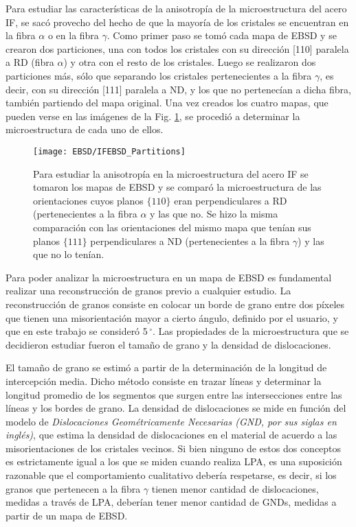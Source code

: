 Para estudiar las características de la anisotropía de la microestructura del acero IF, se sacó provecho del hecho de que la mayoría de los cristales se encuentran en la fibra $\alpha$ o en la fibra $\gamma$.
Como primer paso se tomó cada mapa de EBSD y se crearon dos particiones, una con todos los cristales con su dirección [110] paralela a RD (fibra $\alpha$) y otra con el resto de los cristales.
Luego se realizaron dos particiones más, sólo que separando los cristales pertenecientes a la fibra $\gamma$, es decir, con su dirección [111] paralela a ND, y los que no pertenecían a dicha fibra, también partiendo del mapa original.
Una vez creados los cuatro mapas, que pueden verse en las imágenes de la Fig. \ref{fig:IFEBSDPar}, se procedió a determinar la microestructura de cada uno de ellos.
\begin{figure}[!htb]
  \centering
  \texttt{[image: EBSD/IFEBSD\_Partitions]}
  \caption{Para estudiar la anisotropía en la microestructura del acero IF se tomaron los mapas de EBSD y se comparó la microestructura de las orientaciones cuyos planos $\{110\}$ eran perpendiculares a RD (pertenecientes a la fibra $\alpha$ y las que no. Se hizo la misma comparación con las orientaciones del mismo mapa que tenían sus planos $\{111\}$ perpendiculares a ND (pertenecientes a la fibra $\gamma$) y las que no lo tenían.}
  \label{fig:IFEBSDPar}
\end{figure}

Para poder analizar la microestructura en un mapa de EBSD es fundamental realizar una reconstrucción de granos previo a cualquier estudio.
La reconstrucción de granos consiste en colocar un borde de grano entre dos píxeles que tienen una misorientación mayor a cierto ángulo, definido por el usuario, y que en este trabajo se consideró 5\,$^{\circ}$. Las propiedades de la microestructura que se decidieron estudiar fueron el tamaño de grano y la densidad de dislocaciones.


El tamaño de grano se estimó a partir de la determinación de la longitud de intercepción media.
Dicho método consiste en trazar líneas y determinar la longitud promedio de los segmentos que surgen entre las intersecciones entre las líneas y los bordes de grano.
La densidad de dislocaciones se mide en función del modelo de \textit{Dislocaciones Geométricamente Necesarias (GND, por sus siglas en inglés)}\cite{Pantleon2008}, que estima la densidad de dislocaciones en el material de acuerdo a las misorientaciones de los cristales vecinos.
Si bien ninguno de estos dos conceptos es estrictamente igual a los que se miden cuando realiza LPA, es una suposición razonable que el comportamiento cualitativo debería respetarse, es decir, si los granos que pertenecen a la fibra $\gamma$ tienen menor cantidad de dislocaciones, medidas a través de LPA, deberían tener menor cantidad de GNDs, medidas a partir de un mapa de EBSD.

